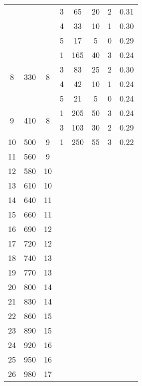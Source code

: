 \begin{longtable}[c]{|c|c|c|c|c|c|c|c|}
    & & & 3 & 65 & 20 & 2 & 0.31 \\\cline{4-8}
    & & & 4 & 33 & 10 & 1 & 0.30 \\\cline{4-8}
    & & & 5 & 17 & 5 & 0 & 0.29 \\\hline
    \multirow{4}{*}{8} & \multirow{4}{*}{330} & \multirow{4}{*}{8} & 1 & 165 & 40 & 3 & 0.24 \\\cline{4-8}
    & & & 3 & 83 & 25 & 2 & 0.30 \\\cline{4-8}
    & & & 4 & 42 & 10 & 1 & 0.24 \\\cline{4-8}
    & & & 5 & 21 & 5 & 0 & 0.24 \\\hline
    \multirow{2}{*}{9} & \multirow{2}{*}{410} & \multirow{2}{*}{8} & 1 & 205 & 50 & 3 & 0.24 \\\cline{4-8}
    & & & 3 & 103 & 30 & 2 & 0.29 \\\hline
    \multirow{1}{*}{10} & \multirow{1}{*}{500} & \multirow{1}{*}{9} & 1 & 250 & 55 & 3 & 0.22 \\\hline
    \multirow{1}{*}{11} & \multirow{1}{*}{560} & \multirow{1}{*}{9} & & & & & \\\hline
    \multirow{1}{*}{12} & \multirow{1}{*}{580} & \multirow{1}{*}{10} & & & & & \\\hline
    \multirow{1}{*}{13} & \multirow{1}{*}{610} & \multirow{1}{*}{10} & & & & & \\\hline
    \multirow{1}{*}{14} & \multirow{1}{*}{640} & \multirow{1}{*}{11} & & & & & \\\hline
    \multirow{1}{*}{15} & \multirow{1}{*}{660} & \multirow{1}{*}{11} & & & & & \\\hline
    \multirow{1}{*}{16} & \multirow{1}{*}{690} & \multirow{1}{*}{12} & & & & & \\\hline
    \multirow{1}{*}{17} & \multirow{1}{*}{720} & \multirow{1}{*}{12} & & & & & \\\hline
    \multirow{1}{*}{18} & \multirow{1}{*}{740} & \multirow{1}{*}{13} & & & & & \\\hline
    \multirow{1}{*}{19} & \multirow{1}{*}{770} & \multirow{1}{*}{13} & & & & & \\\hline
    \multirow{1}{*}{20} & \multirow{1}{*}{800} & \multirow{1}{*}{14} & & & & & \\\hline
    \multirow{1}{*}{21} & \multirow{1}{*}{830} & \multirow{1}{*}{14} & & & & & \\\hline
    \multirow{1}{*}{22} & \multirow{1}{*}{860} & \multirow{1}{*}{15} & & & & & \\\hline
    \multirow{1}{*}{23} & \multirow{1}{*}{890} & \multirow{1}{*}{15} & & & & & \\\hline
    \multirow{1}{*}{24} & \multirow{1}{*}{920} & \multirow{1}{*}{16} & & & & & \\\hline
    \multirow{1}{*}{25} & \multirow{1}{*}{950} & \multirow{1}{*}{16} & & & & & \\\hline
    \multirow{1}{*}{26} & \multirow{1}{*}{980} & \multirow{1}{*}{17} & & & & & \\\hline
\end{longtable}


